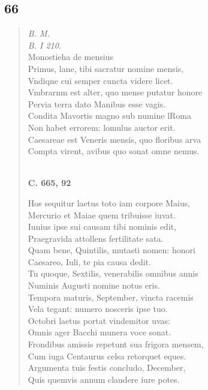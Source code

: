 \documentclass[11pt, a4paper]{report}
\begin{document}
            \subsection*{66}
      \begin{verse}
      \textit{B. M.} \\ \textit{B. I 210.} \\ Monostieha de mensius \\ Primus, lane, tibi sacratur nomine mensis, \\ Vndiqne cui semper cuncta videre licet. \\ Vmbrarnm est alter, quo mense putatur honore \\ Pervia terra dato Manibus esse vagis. \\ Condita Mavortis magno sub numine lRoma \\ Non habet errorem: lomulus auctor erit. \\ Caesareae est Veneris mensis, quo floribus arva \\ Compta virent, avibus quo sonat omne nemus. \\ 
        ﻿\pagebreak 
     \marginpar{[136]} \begin{center} \textbf{C. 665, 92} \end{center}Hos sequitur laetus toto iam corpore Maius, \\ Mercurio et Maiae quem tribuisse iuvat. \\ Iunius ipse sui causam tibi nominis edit, \\ Praegravida attollens fertilitate sata. \\ Quam bene, Quintilis, mutasti nomen: honori \\ Caesareo, Iuli, te pia causa dedit. \\ Tu quoque, Sextilis, venerabilis omnibus annis \\ Numinis Augusti nomine notus eris. \\ Tempora maturis, September, vincta racemis \\ Vela tegant: numero nosceris ipse tuo. \\ Octobri laetus portat vindemitor uvas: \\ Omnis ager Bacchi munera voce sonat. \\ Frondibus amissis repetunt sua frigora mensem, \\ Cum iuga Centaurus celsa retorquet eques. \\ Argumenta tuis festis concludo, December, \\ Quis quemvis annum claudere  \lbrack iure potes. \\ 

\end{verse}
\end{document}
